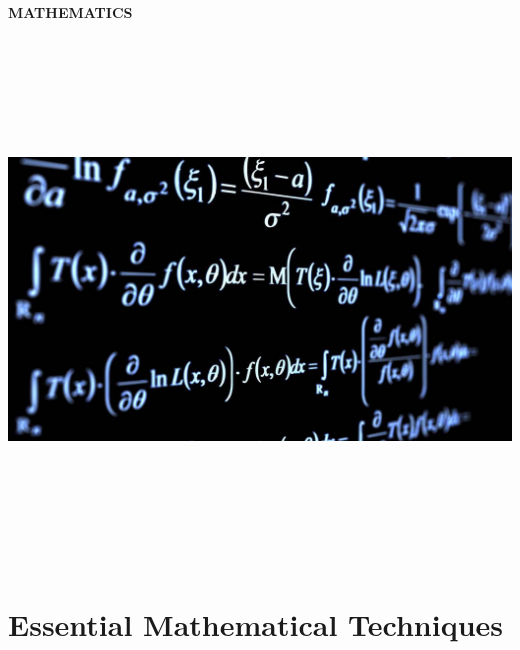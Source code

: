 \documentclass[a4paper,10pt]{book}
\begin{document}
\newcommand{\formula}[1]{%
    \colorbox{formulaback}{\ensuremath{#1}}%
}
\newcommand{\sectionbreak}{\clearpage} %

\mainmatter
\vspace*{47mm}

\begin{center}

{\fontsize{55}{20}\selectfont \textcolor{headingcolor}{\bfseries MATHEMATICS}}
\end{center}

\vspace{50mm}

\begin{center}
\includegraphics[height=13.88cm, width=17cm, keepaspectratio]{Pics/maths.jpg}
\end{center}

\chapter{Essential Mathematical Techniques}%
\label{sec:maths}
\end{document}
